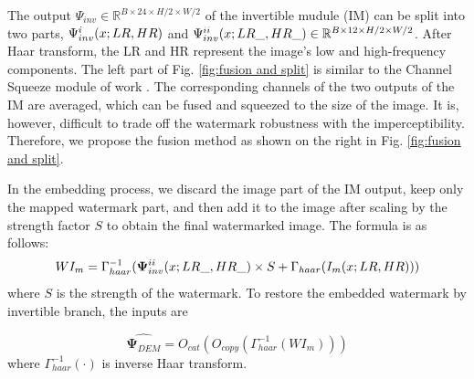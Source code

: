 \documentclass[sigconf]{acmart}
\begin{document}
The output ${\Psi}_{inv} \in \mathbb{R}^{B\times 24\times H/2\times W/2}$ of the invertible mudule (IM) can be split into two parts, ${\Psi}^{\uppercase\expandafter{\romannumeral1}}_{inv}(x; LR, HR)$ and ${\Psi}^{\uppercase\expandafter{\romannumeral2}}_{inv}(x; LR\_, HR\_)\in \mathbb{R}^{B\times 12\times H/2\times W/2}$. 
After Haar transform, the LR and HR represent the image's low and high-frequency components. The left part of Fig. \ref{fig:fusion and split} is similar to the Channel Squeeze module of work \cite{cheng2021iicnet}. The corresponding channels of the two outputs of the IM are averaged, which can be fused and squeezed to the size of the image. 
It is, however, difficult to trade off the watermark robustness with the imperceptibility. Therefore, we propose the fusion method as shown on the right in Fig. \ref{fig:fusion and split}. 

In the embedding process, we discard the image part of the IM output, keep only the mapped watermark part, and then add it to the image after scaling by the strength factor $S$ to obtain the final watermarked image.
The formula is as follows:
\begin{equation}
   WI_{m}=\Gamma^{-1}_{haar}(\mathbf{\Psi}^{\uppercase\expandafter{\romannumeral2}}_{inv}(x; LR\_, HR\_)\times S + \Gamma_{haar}({I}_{m}(x; LR, HR)))
\end{equation}
where $S$ is the strength of the watermark.
To restore the embedded watermark by invertible branch, the inputs are

\begin{equation}
    \hat{\mathbf{\Psi}_{DEM}}={O}_{cat}({O}_{copy}(\Gamma^{-1}_{haar}({WI}_{m})))
\end{equation}
where $\Gamma^{-1}_{haar}(\cdot)$ is inverse Haar transform.
\end{document}
